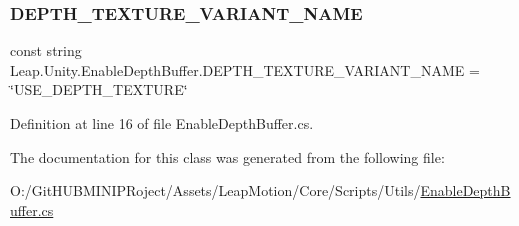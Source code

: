 \subsubsection{\texorpdfstring{DEPTH\_TEXTURE\_VARIANT\_NAME}{DEPTH\_TEXTURE\_VARIANT\_NAME}}
{\footnotesize\ttfamily const string Leap.\+Unity.\+Enable\+Depth\+Buffer.\+D\+E\+P\+T\+H\+\_\+\+T\+E\+X\+T\+U\+R\+E\+\_\+\+V\+A\+R\+I\+A\+N\+T\+\_\+\+N\+A\+ME = \char`\"{}U\+S\+E\+\_\+\+D\+E\+P\+T\+H\+\_\+\+T\+E\+X\+T\+U\+RE\char`\"{}}



Definition at line 16 of file Enable\+Depth\+Buffer.\+cs.



The documentation for this class was generated from the following file\+:\begin{DoxyCompactItemize}
\item 
O\+:/\+Git\+H\+U\+B\+M\+I\+N\+I\+P\+Roject/\+Assets/\+Leap\+Motion/\+Core/\+Scripts/\+Utils/\mbox{\hyperlink{_enable_depth_buffer_8cs}{Enable\+Depth\+Buffer.\+cs}}\end{DoxyCompactItemize}
